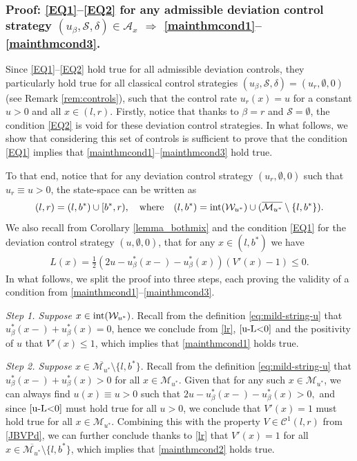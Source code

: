 \documentclass[11pt]{article} %
\numberwithin{komcounter}{section}
\begin{document}
\subsubsection{Proof: \eqref{EQ1}--\eqref{EQ2} for any admissible deviation control strategy $(u_\beta, \mathcal{S}, \delta)\in \mathcal{A}_{x}$ $\Rightarrow$  \eqref{mainthmcond1}--\eqref{mainthmcond3}.}


Since \eqref{EQ1}--\eqref{EQ2} hold true for all admissible deviation controls, they particularly hold true for all classical control strategies $(u_\beta,\mathcal{S},\delta) = (u_r, \emptyset, 0)$ (see Remark \ref{rem:controls}), such that the control rate $u_r(x) = u$ for a constant $u>0$ and all $x\in(l,r)$.
Firstly, notice that thanks to $\beta=r$ and $\mathcal{S} = \emptyset$, the condition \eqref{EQ2} is void for these deviation control strategies.
In what follows, we show that considering this set of controls is sufficient to prove that the condition \eqref{EQ1} implies that  \eqref{mainthmcond1}--\eqref{mainthmcond3} hold true. 

To that end, notice that for any deviation control strategy $(u_r, \emptyset, 0)$ such that $u_r \equiv u > 0$, the state-space can be written as 
\begin{equation} \label{lr}
(l,r) = (l,b^*)
\cup [b^*,r), 
\quad \text{where} \quad 
(l,b^*) = {\rm int}({\mathcal{W}}_{u^*})
\cup (\overline{\mathcal{M}_{u^*}} \setminus \{l,b^*\}).
\end{equation}
We also recall from Corollary \ref{lemma_bothmix} and the condition \eqref{EQ1} for the deviation control strategy $(u, \emptyset, 0)$, that for any $x\in (l,b^*)$ we have  
\begin{align} \label{u-L<0}
L(x) = \frac{1}{2}\left(2 u - u_\beta^*(x-) - u_\beta^*(x) \right)(V'(x)-1) \leq 0. 
\end{align}
In what follows, we split the proof into three steps, each proving the validity of a condition from \eqref{mainthmcond1}--\eqref{mainthmcond3}. 

\vspace{1mm}
{\it Step 1. Suppose $x\in {\rm int}({\mathcal{W}_{u^*}})$}. 
Recall from the definition \eqref{eq:mild-string-u} that $u_\beta^*(x-) + u_\beta^*(x) = 0$, hence we conclude from \eqref{lr}, $\eqref{u-L<0}$ and the positivity of $u$ that $V'(x) \leq 1$, which implies that \eqref{mainthmcond1} holds true.

\vspace{1mm}
{\it Step 2. Suppose $x\in \overline{\mathcal{M}_{u^*}} \setminus \{l,b^*\}$}.  
Recall from the definition \eqref{eq:mild-string-u} that $u_\beta^*(x-) + u_\beta^*(x) > 0$ for all $x\in \mathcal{M}_{u^*}$. Given that for any such $x\in \mathcal{M}_{u^*}$, we can always find $u(x) \equiv u >0$ such that 
$2 u - u_\beta^*(x-) - u_\beta^*(x) > 0,$
and since $\eqref{u-L<0}$ must hold true for all $u>0$, we conclude that $V'(x) = 1$ must hold true for all $x \in \mathcal{M}_{u^*}$. 
Combining this with the property $V \in {\mathcal C}^1(l,r)$ from \eqref{JBVPd}, we can further conclude thanks to \eqref{lr} that $V'(x) = 1$ for all $x \in 
\overline{\mathcal{M}_{u^*}} \setminus \{l,b^*\}$, which implies that \eqref{mainthmcond2} holds true.
\end{document}

